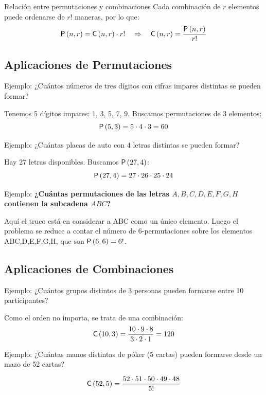 \begin{thmblock}{Relación entre permutaciones y combinaciones}
Cada combinación de $r$ elementos puede ordenarse de $r!$ maneras, por lo que:
\[
\mathsf{P}\left(n,r\right) = \mathsf{C}\left(n,r\right) \cdot r! \quad \Rightarrow \quad \mathsf{C}\left(n,r\right) = \frac{\mathsf{P}\left(n,r\right)}{r!}
\]
\end{thmblock}

\subsection*{Aplicaciones de Permutaciones}

\begin{exampleblock}{Ejemplo: ¿Cuántos números de tres dígitos con cifras impares distintas se pueden formar?}

Tenemos 5 dígitos impares: 1, 3, 5, 7, 9. Buscamos permutaciones de 3 elementos:
\[
\mathsf{P}\left(5,3\right) = 5 \cdot 4 \cdot 3 = 60
\]
\end{exampleblock}

\begin{exampleblock}{Ejemplo: ¿Cuántas placas de auto con 4 letras distintas se pueden formar?}

Hay 27 letras disponibles. Buscamos $\mathsf{P}\left(27,4\right)$:
\[
\mathsf{P}\left(27,4\right) = 27 \cdot 26 \cdot 25 \cdot 24
\]
\end{exampleblock}

\begin{exampleblock}{Ejemplo:} \textbf{¿Cuántas permutaciones de las letras $A,B,C,D,E,F,G,H$ contienen la subcadena $ABC$? }

\medskip Aquí el truco está en considerar a ABC como un único
elemento. Luego el problema se reduce a contar el número de 6-permutaciones
sobre los elementos ABC,D,E,F,G,H, que son $\mathsf{P}\left(6,6\right) = 6!$.
\end{exampleblock}

\subsection*{Aplicaciones de Combinaciones}

\begin{exampleblock}{Ejemplo: ¿Cuántos grupos distintos de 3 personas pueden formarse entre 10 participantes?}

Como el orden no importa, se trata de una combinación:
\[
\mathsf{C}\left(10,3\right) = \frac{10 \cdot 9 \cdot 8}{3 \cdot 2 \cdot 1} = 120
\]
\end{exampleblock}

\begin{exampleblock}{Ejemplo: ¿Cuántas manos distintas de póker (5 cartas) pueden formarse desde un mazo de 52 cartas?}

\[
\mathsf{C}\left(52,5\right) = \frac{52 \cdot 51 \cdot 50 \cdot 49 \cdot 48}{5!}
\]
\end{exampleblock}

